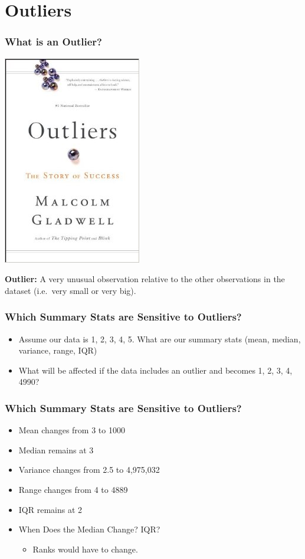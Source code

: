 \documentclass[handout]{beamer}
\begin{document}
\section{Outliers}
\begin{frame}
\frametitle{What is an Outlier?}
	\begin{center}
		\includegraphics[scale = 0.4]{./images/outliers.jpg}
	\end{center}
	\centering
	\textbf{Outlier:} A very unusual observation relative to the other observations in the dataset 		(i.e.\ very small or very big).
\end{frame}

\begin{frame}
\frametitle{Which Summary Stats are Sensitive to Outliers?}
	\begin{itemize}
		\item Assume our data is 1, 2, 3, 4, 5. What are our summary stats (mean, median, variance, 			range, IQR)
		\item What will be affected if the data includes an outlier and becomes 1, 2, 3, 4, 4990?
	\end{itemize}
\end{frame}

\begin{frame}
\frametitle{Which Summary Stats are Sensitive to Outliers?}
	\begin{itemize}[<+->]
		\item Mean changes from 3 to 1000
		\item Median remains at 3
		\item Variance changes from 2.5 to 4,975,032
		\item Range changes from 4 to 4889
		\item IQR remains at 2
		\item \alert{When Does the Median Change? IQR?}
		\begin{itemize}
			\item Ranks would have to change.
		\end{itemize}
	\end{itemize}
\end{frame}
\end{document}
